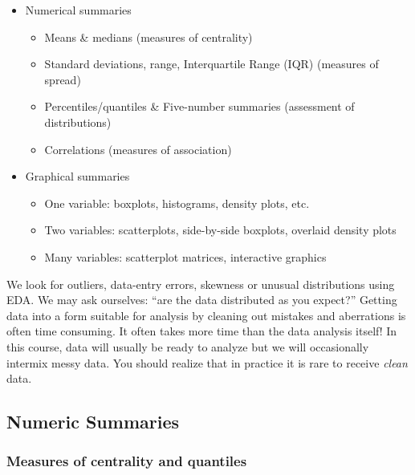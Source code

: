 \documentclass[
]{book}
\providecommand{\tightlist}{%
  \setlength{\itemsep}{0pt}\setlength{\parskip}{0pt}}
\begin{document}
\begin{itemize}
\tightlist
\item
  Numerical summaries

  \begin{itemize}
  \tightlist
  \item
    Means \& medians (measures of centrality)
  \item
    Standard deviations, range, Interquartile Range (IQR) (measures of spread)
  \item
    Percentiles/quantiles \& Five-number summaries (assessment of distributions)
  \item
    Correlations (measures of association)
  \end{itemize}
\item
  Graphical summaries

  \begin{itemize}
  \tightlist
  \item
    One variable: boxplots, histograms, density plots, etc.
  \item
    Two variables: scatterplots, side-by-side boxplots, overlaid density plots
  \item
    Many variables: scatterplot matrices, interactive graphics
  \end{itemize}
\end{itemize}

We look for outliers, data-entry errors, skewness or unusual distributions using EDA.
We may ask ourselves: ``are the data distributed as you expect?''
Getting data into a form suitable for analysis by cleaning out mistakes and aberrations is often time consuming.
It often takes more time than the data analysis itself!
In this course, data will usually be ready to analyze but we will occasionally intermix messy data.
You should realize that in practice it is rare to receive \emph{clean} data.

\hypertarget{numeric-summaries}{%
\subsection{Numeric Summaries}\label{numeric-summaries}}

\hypertarget{measures-of-centrality-and-quantiles}{%
\subsubsection{Measures of centrality and quantiles}\label{measures-of-centrality-and-quantiles}}
\end{document}
